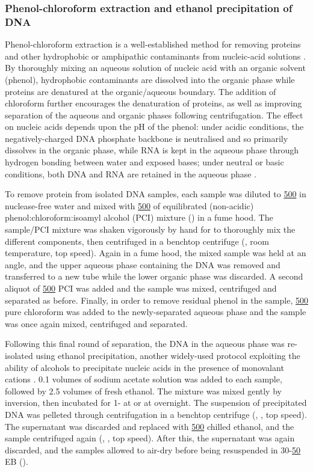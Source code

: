 \subsubsection{Phenol-chloroform extraction and ethanol precipitation of DNA}
\label{sec:methods_molec_standard_phenol}

Phenol-chloroform extraction is a well-established method for removing proteins and other hydrophobic or amphipathic contaminants from nucleic-acid solutions \parencite{zumbo2012phenolchloroform}. By thoroughly mixing an aqueous solution of nucleic acid with an organic solvent (phenol), hydrophobic contaminants are dissolved into the organic phase while proteins are denatured at the organic/aqueous boundary. The addition of chloroform further encourages the denaturation of proteins, as well as improving separation of the aqueous and organic phases following centrifugation. The effect on nucleic acids depends upon the pH of the phenol: under acidic conditions, the negatively-charged DNA phosphate backbone is neutralised and so primarily dissolves in the organic phase, while RNA is kept in the aqueous phase through hydrogen bonding between water and exposed bases; under neutral or basic conditions, both DNA and RNA are retained in the aqueous phase \parencite{zumbo2012phenolchloroform}.

To remove protein from isolated DNA samples, each sample was diluted to \ul{500} in nuclease-free water and mixed with \ul{500} of equilibrated (non-acidic) phenol:chloroform:isoamyl alcohol (PCI) mixture () in a fume hood. The sample/PCI mixture was shaken vigorously by hand for  to thoroughly mix the different components, then centrifuged in a benchtop centrifuge (, room temperature, top speed). Again in a fume hood, the mixed sample was held at an angle, and the upper aqueous phase containing the DNA was removed and transferred to a new tube while the lower organic phase was discarded. A second aliquot of \ul{500} PCI was added and the sample was mixed, centrifuged and separated as before. Finally, in order to remove residual phenol in the sample, \ul{500} pure chloroform was added to the newly-separated aqueous phase and the sample was once again mixed, centrifuged and separated. 

Following this final round of separation, the DNA in the aqueous phase was re-isolated using ethanol precipitation, another widely-used protocol exploiting the ability of alcohols to precipitate nucleic acids in the presence of monovalant cations \parencite{zumbo2012ethanol}. 0.1 volumes of  sodium acetate solution was added to each sample, followed by 2.5 volumes of fresh  ethanol. The mixture was mixed gently by inversion, then incubated for 1- at  or at  overnight. The suspension of precipitated DNA was pelleted through centrifugation in a benchtop centrifuge (, , top speed). The supernatant was discarded and replaced with \ul{500} chilled  ethanol, and the sample centrifuged again (, , top speed). After this, the supernatant was again discarded, and the samples allowed to air-dry before being resuspended in 30-\ul{50} EB (). 

